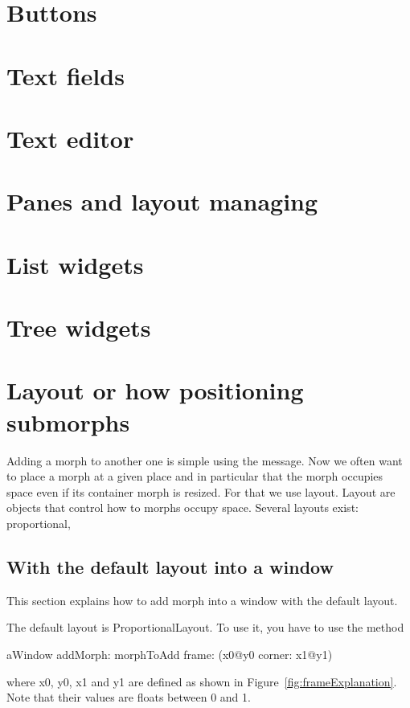 \documentclass[a4paper,10pt,twoside]{book}
\begin{document}
\section{Buttons}

\section{Text fields}

\section{Text editor}

\section{Panes and layout managing}

\section{List widgets}

\section{Tree widgets}

\section{Layout or how positioning submorphs}


Adding a morph to another one is simple using the  message. Now we often want to place a morph at a given place and in particular that the morph occupies space even if its container morph is resized. For that we use layout. Layout are objects that control how to morphs occupy space. Several layouts exist: proportional, 


\subsection{With the default layout into a window}

This section  explains how to add morph into a window with the default layout.

The default layout is ProportionalLayout. To use it, you have to use the method 
\begin{code}{}
aWindow
	addMorph: morphToAdd
	frame: (x0@y0 corner: x1@y1)
\end{code}
where x0, y0, x1 and y1 are defined as shown in  Figure~\ref{fig:frameExplanation}. Note that their values are floats between 0 and 1.
\end{document}
